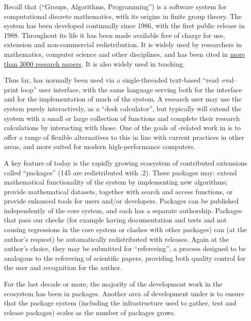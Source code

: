 Recall that \GAP (``Groups, Algorithms, Programming'') is a software system for
computational discrete mathematics, with its origins in finite group
theory. The system has been developed continually since 1986, with the
first public release in 1988. Throughout its life it has been made
available free of charge for use, extension and non-commercial
redistribution. It is widely used by researchers in mathematics,
computer science and other disciplines, and has been cited in
\href{https://www.gap-system.org/Doc/Bib/bib.html}{more than 3000
  research papers}. It is also widely used in teaching.

Thus far, \GAP has
normally been used via a single-threaded text-based ``read--eval--print loop'' user interface, with the
same \GAP language serving both for the interface and for the
implementation of much of the system. A research user 
may use the system purely interactively, as a ``desk calculator'', but
typically will extend the system with a small or large collection of
\GAP functions and complete their research calculations by interacting
with those. One of the goals of \GAP-related work in \ODK is to offer
a range of flexible alternatives to this in line with current
practices in other areas, and more suited for modern high-performance
computers.

A key feature of \GAP today is the rapidly growing ecosystem of
contributed extensions called ``packages'' (145 are redistributed with
.2). These packages may: extend mathematical functionality of
the system by implementing new algorithms; provide mathematical
datasets, together with search and access functions, or provide
enhanced tools for users and/or developers. Packages can be published
independently of the core \GAP system, and each has a separate
authorship. Packages that pass our checks (for example having
documentation and tests and not causing regressions in the core system
or clashes with other packages) can (at the author's request) be
automatically redistributed with \GAP releases. Again at the author's
choice, they may be
submitted for ``refereeing'', a process designed to be analogous to the
refereeing of scientific papers, providing both quality control for
the user and recognition for the author.

For the last decade or more, the majority of the
development work in the \GAP ecosystem has been in packages.
Another area of \GAP development under \ODK is to ensure
that the package system (including the infrastructure used to gather,
test and release packages) scales as the number of packages grows.


